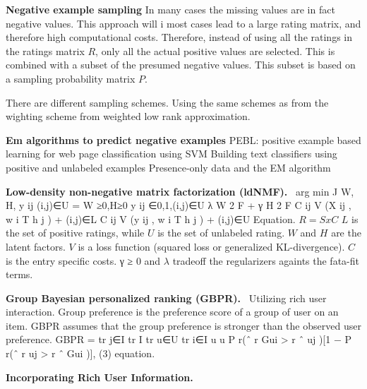 \textbf{Negative example sampling }%
In many cases the missing values are in fact negative values.
This approach will i most cases lead to a large rating matrix, and therefore high computational costs.
Therefore, instead of using all the ratings in the ratings matrix $R$, only all the actual positive values are selected.
This is combined with a subset of the presumed negative values.
This subset is based on a sampling probability matrix $P$.

There are different sampling schemes.
Using the same schemes as from the wighting scheme from weighted low rank approximation.

\textbf{Em algorithms to predict negative examples} %
PEBL: positive example based learning for web page classification using SVM
Building text classifiers using positive and unlabeled examples
Presence-only data and the EM algorithm

\textbf{Low-density non-negative matrix factorization (ldNMF).}~%
arg min
J W, H, {y ij } (i,j)∈U =
W ≥0,H≥0
y ij ∈{0,1},(i,j)∈U
λ W
2
F
+ γ H
2
F
C ij V (X ij , w i T h j )
+
(i,j)∈L
C ij V (y ij , w i T h j )
+
(i,j)∈U
Equation.
$R = SxC$ %
$L$ is the set of positive ratings, while $U$ is the set of unlabeled rating.
$W$ and $H$ are the latent factors.
$V$ is a loss function (squared loss or generalized KL-divergence).
$C$ is the entry specific costs.
γ ≥ 0 and $λ$ tradeoff the regularizers againts the fata-fit terms.

\textbf{Group Bayesian personalized ranking (GBPR).}~%
Utilizing rich user interaction.
Group preference is the preference score of a group of user on an item. %
GBPR assumes that the group preference is stronger than the observed user preference.
GBPR =
tr j∈I tr I tr
u∈U tr i∈I u
u
P r(ˆ
r Gui > r ˆ uj )[1 − P r(ˆ
r uj > r ˆ Gui )], (3)
equation.

\textbf{Incorporating Rich User Information. }%

